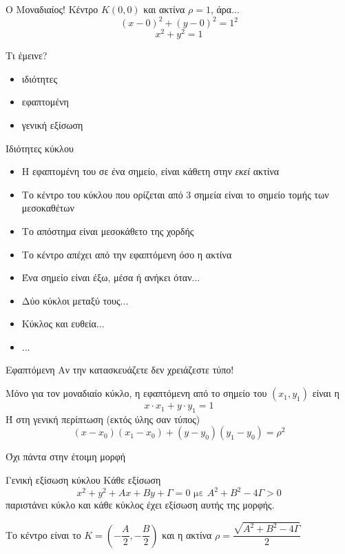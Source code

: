 \documentclass{../../presentation}
\begin{document}
\begin{frame}{Ο Μοναδιαίος!}
  Κέντρο $Κ(0,0)$ και ακτίνα $ρ=1$, άρα...
  $$(x-0)^2+(y-0)^2=1^2$$
  $$x^2+y^2=1$$
\end{frame}

\begin{frame}{Τι έμεινε?}
  \begin{itemize}
    \item ιδιότητες
    \item εφαπτομένη
    \item γενική εξίσωση
  \end{itemize}
\end{frame}

\begin{frame}{Ιδιότητες κύκλου}
  \begin{itemize}
    \item<1-> Η εφαπτομένη του σε ένα σημείο, είναι κάθετη στην \emph{εκεί} ακτίνα
    \item<2-> Το κέντρο του κύκλου που ορίζεται από $3$ σημεία είναι το σημείο τομής των μεσοκαθέτων
    \item<3-> Το απόστημα είναι μεσοκάθετο της χορδής
    \item<4-> Το κέντρο απέχει από την εφαπτόμενη όσο η ακτίνα
    \item<5-> Ένα σημείο είναι έξω, μέσα ή ανήκει όταν...
    \item<6-> Δύο κύκλοι μεταξύ τους...
    \item<7-> Κύκλος και ευθεία...
    \item<8-> ...
  \end{itemize}

\end{frame}

\begin{frame}[label=Εφαπτόμενη]{Εφαπτόμενη}
  Αν την κατασκευάζετε δεν χρειάζεστε τύπο!

  Μόνο για τον μοναδιαίο κύκλο, η εφαπτόμενη από το σημείο του $(x_1,y_1)$ είναι η
  $$x\cdot x_1+y\cdot y_1=1$$
  Ή στη γενική περίπτωση (εκτός ύλης σαν τύπος)
  $$(x-x_0)(x_1-x_0)+(y-y_0)(y_1-y_0)=ρ^2$$

  \hyperlink{Απόδειξη}{}
\end{frame}

\begin{frame}[label=ΓενικήΕξίσωση]{Όχι πάντα στην έτοιμη μορφή}

  \begin{block}{Γενική εξίσωση κύκλου}
    Κάθε εξίσωση
    $$x^2+y^2+Αx+Βy+Γ=0\text{ με }Α^2+Β^2-4Γ>0$$
    παριστάνει κύκλο και κάθε κύκλος έχει εξίσωση αυτής της μορφής.

    Το κέντρο είναι το $Κ=(-\dfrac{Α}{2},-\dfrac{Β}{2})$ και η ακτίνα $ρ=\dfrac{\sqrt{Α^2+Β^2-4Γ}}{2}$
  \end{block}

  \hyperlink{Απόδειξη2}{}

  \hyperlink{Απόδειξη3}{}
\end{frame}
\end{document}
